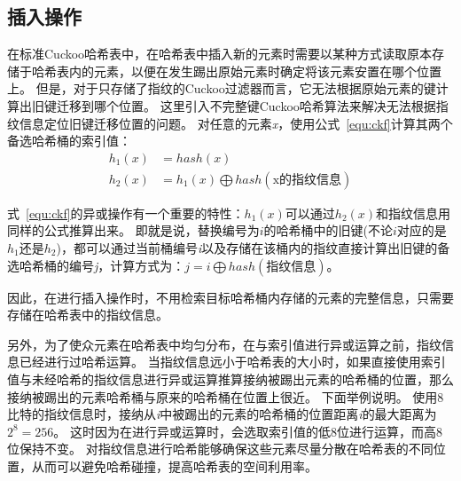 \subsection{插入操作}
在标准Cuckoo哈希表中，在哈希表中插入新的元素时需要以某种方式读取原本存储于哈希表内的元素，以便在发生踢出原始元素时确定将该元素安置在哪个位置上。
但是，对于只存储了指纹的Cuckoo过滤器而言，它无法根据原始元素的键计算出旧键迁移到哪个位置。
这里引入不完整键Cuckoo哈希算法来解决无法根据指纹信息定位旧键迁移位置的问题。
对任意的元素\textit{x}，使用公式~\ref{equ:ckf}计算其两个备选哈希桶的索引值：
\begin{equation}
\begin{split}
h_1\left(x\right) &= hash\left(x\right) \\
h_2(x) &= h_1(x)\bigoplus hash(\text{x的指纹信息})
\end{split}
\label{equ:ckf}
\end{equation}

式~\ref{equ:ckf}的异或操作有一个重要的特性：$h_1(x)$可以通过$h_2(x)$和指纹信息用同样的公式推算出来。
即就是说，替换编号为$i$的哈希桶中的旧键(不论$i$对应的是$h_1$还是$h_2$)，都可以通过当前桶编号\textit{i}以及存储在该桶内的指纹直接计算出旧键的备选哈希桶的编号\textit{j}，计算方式为：$j = i \bigoplus hash(\text{指纹信息})$。

因此，在进行插入操作时，不用检索目标哈希桶内存储的元素的完整信息，只需要存储在哈希表中的指纹信息。

另外，为了使众元素在哈希表中均匀分布，在与索引值进行异或运算之前，指纹信息已经进行过哈希运算。
当指纹信息远小于哈希表的大小时，如果直接使用索引值与未经哈希的指纹信息进行异或运算推算接纳被踢出元素的哈希桶的位置，那么接纳被踢出的元素哈希桶与原来的哈希桶在位置上很近。
下面举例说明。
使用8比特的指纹信息时，接纳从\textit{i}中被踢出的元素的哈希桶的位置距离\textit{i}的最大距离为$2^8 = 256$。
这时因为在进行异或运算时，会选取索引值的低8位进行运算，而高8位保持不变。
对指纹信息进行哈希能够确保这些元素尽量分散在哈希表的不同位置，从而可以避免哈希碰撞，提高哈希表的空间利用率。

